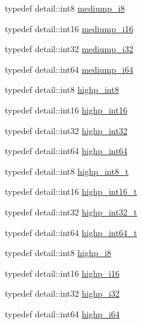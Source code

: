 \begin{DoxyCompactItemize}
\item 
typedef detail\+::int8 \hyperlink{group__gtc__type__precision_ga28a8b5fd51072680bb55178c17cc7411}{mediump\+\_\+i8}
\item 
typedef detail\+::int16 \hyperlink{group__gtc__type__precision_ga8454fc6a82c7bb787d0ac9663e08f63d}{mediump\+\_\+i16}
\item 
typedef detail\+::int32 \hyperlink{group__gtc__type__precision_ga5e00ec824eb55968a6b6496f294d8c07}{mediump\+\_\+i32}
\item 
typedef detail\+::int64 \hyperlink{group__gtc__type__precision_ga90fedf6c701ffbe00535156715e50787}{mediump\+\_\+i64}
\item 
typedef detail\+::int8 \hyperlink{group__gtc__type__precision_ga57c86999e666760c304453f9bfdc09d1}{highp\+\_\+int8}
\item 
typedef detail\+::int16 \hyperlink{group__gtc__type__precision_gaf0430ed80e88c0d1dfbe47f359659c81}{highp\+\_\+int16}
\item 
typedef detail\+::int32 \hyperlink{group__gtc__type__precision_gaa2045c92b9553d463191af6a20e997bb}{highp\+\_\+int32}
\item 
typedef detail\+::int64 \hyperlink{group__gtc__type__precision_ga7ffb27943e9569800979081bc548621c}{highp\+\_\+int64}
\item 
typedef detail\+::int8 \hyperlink{group__gtc__type__precision_ga417701b99e6e7992f35ab2ef694f88b2}{highp\+\_\+int8\+\_\+t}
\item 
typedef detail\+::int16 \hyperlink{group__gtc__type__precision_ga07d318d61472e75238e53b9642227672}{highp\+\_\+int16\+\_\+t}
\item 
typedef detail\+::int32 \hyperlink{group__gtc__type__precision_ga783d077a513c1f475f6cdb406b4238c3}{highp\+\_\+int32\+\_\+t}
\item 
typedef detail\+::int64 \hyperlink{group__gtc__type__precision_ga0f5186bde44471133b08057cae8a51ac}{highp\+\_\+int64\+\_\+t}
\item 
typedef detail\+::int8 \hyperlink{group__gtc__type__precision_ga8b9eb0b24cce7f14478bfcacb53ce839}{highp\+\_\+i8}
\item 
typedef detail\+::int16 \hyperlink{group__gtc__type__precision_gaa04399853952dbce29cb62e2432f350a}{highp\+\_\+i16}
\item 
typedef detail\+::int32 \hyperlink{group__gtc__type__precision_ga197d19b585222da57d70238a5cfc2be8}{highp\+\_\+i32}
\item 
typedef detail\+::int64 \hyperlink{group__gtc__type__precision_gad3cb9a0ac0266ea2c51c6fac256345d1}{highp\+\_\+i64}

\end{DoxyCompactItemize}
